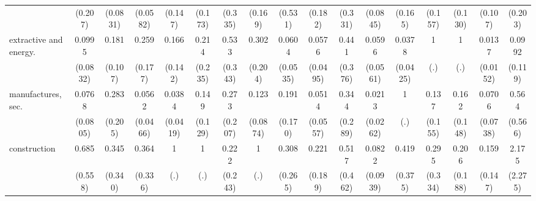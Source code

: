 {\begin{tabular}{l*{16}{c}}
                    &     (0.207)         &    (0.0831)         &    (0.0582)         &     (0.147)         &     (0.173)         &     (0.335)         &     (0.169)         &     (0.531)         &     (0.182)         &     (0.331)         &    (0.0845)         &     (0.165)         &     (0.157)         &     (0.130)         &     (0.107)         &     (0.203)         \\
[1em]
extractive and energy.&      0.0995\sym{**} &       0.181\sym{**} &       0.259\sym{*}  &       0.166\sym{*}  &       0.214         &       0.533         &       0.302         &      0.0604\sym{**} &      0.0576\sym{***}&       0.441         &      0.0596\sym{**} &      0.0378\sym{**} &           1         &           1         &      0.0137\sym{***}&      0.0992         \\
                    &    (0.0832)         &     (0.107)         &     (0.177)         &     (0.142)         &     (0.235)         &     (0.343)         &     (0.204)         &    (0.0535)         &    (0.0495)         &     (0.376)         &    (0.0561)         &    (0.0425)         &         (.)         &         (.)         &    (0.0152)         &     (0.119)         \\
[1em]
manufactures, sec.  &      0.0768\sym{*}  &       0.283         &      0.0562\sym{***}&      0.0384\sym{**} &       0.149\sym{*}  &       0.273         &       0.123\sym{**} &       0.191         &      0.0514\sym{**} &       0.344         &      0.0213\sym{**} &           1         &       0.137         &       0.162\sym{*}  &      0.0706\sym{*}  &       0.564         \\
                    &    (0.0805)         &     (0.205)         &    (0.0466)         &    (0.0419)         &     (0.129)         &     (0.207)         &    (0.0874)         &     (0.170)         &    (0.0557)         &     (0.289)         &    (0.0262)         &         (.)         &     (0.155)         &     (0.148)         &    (0.0738)         &     (0.566)         \\
[1em]
construction        &       0.685         &       0.345         &       0.364         &           1         &           1         &       0.222         &           1         &       0.308         &       0.221         &       0.517         &      0.0822\sym{*}  &       0.419         &       0.295         &       0.206         &       0.159\sym{*}  &       2.175         \\
                    &     (0.558)         &     (0.340)         &     (0.336)         &         (.)         &         (.)         &     (0.243)         &         (.)         &     (0.265)         &     (0.189)         &     (0.462)         &    (0.0939)         &     (0.375)         &     (0.334)         &     (0.188)         &     (0.147)         &     (2.275)         \\

\end{tabular}}
